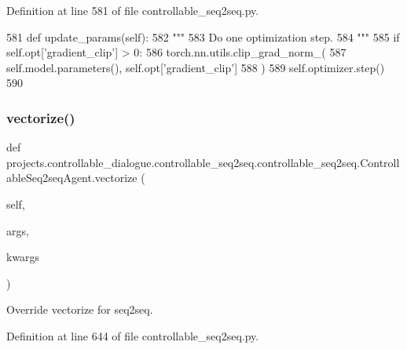 Definition at line 581 of file controllable\+\_\+seq2seq.\+py.


\begin{DoxyCode}
581     \textcolor{keyword}{def }update\_params(self):
582         \textcolor{stringliteral}{"""}
583 \textcolor{stringliteral}{        Do one optimization step.}
584 \textcolor{stringliteral}{        """}
585         \textcolor{keywordflow}{if} self.opt[\textcolor{stringliteral}{'gradient\_clip'}] > 0:
586             torch.nn.utils.clip\_grad\_norm\_(
587                 self.model.parameters(), self.opt[\textcolor{stringliteral}{'gradient\_clip'}]
588             )
589         self.optimizer.step()
590 
\end{DoxyCode}
\mbox{\label{classprojects_1_1controllable__dialogue_1_1controllable__seq2seq_1_1controllable__seq2seq_1_1ControllableSeq2seqAgent_aae1b61b5d838205753a872e34e0c8c34}} 
\subsubsection{\texorpdfstring{vectorize()}{vectorize()}}
{\footnotesize\ttfamily def projects.\+controllable\+\_\+dialogue.\+controllable\+\_\+seq2seq.\+controllable\+\_\+seq2seq.\+Controllable\+Seq2seq\+Agent.\+vectorize (\begin{DoxyParamCaption}\item[{}]{self,  }\item[{}]{args,  }\item[{}]{kwargs }\end{DoxyParamCaption})}

\begin{DoxyVerb}Override vectorize for seq2seq.
\end{DoxyVerb}
 

Definition at line 644 of file controllable\+\_\+seq2seq.\+py.


